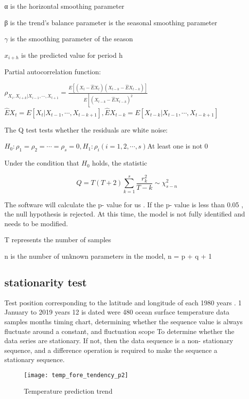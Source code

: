 \documentclass{mcmthesis}
\begin{document}
α is the horizontal smoothing parameter

β is the trend's balance parameter is the seasonal smoothing parameter

\(\gamma\) is the smoothing parameter of the season

\(x_{i+h}\) is the predicted value for period h

Partial autocorrelation function:

\(\rho_{X_{i}, X_{i+k} | X_{i-1}, \cdots, X_{t+1}}=\frac{E\left[\left(X_{t}-\hat{E} X_{t}\right)\left(X_{t-k}-\hat{E} X_{t-k}\right)\right]}{E\left[\left(X_{t-k}-\hat{E} X_{t-k}\right)^{2}\right.}\)
\(\hat{E} X_{t}=E\left[X_{t} | X_{t-1}, \cdots, X_{t-k+1}\right], \hat{E} X_{t-k}=E\left[X_{t-k} | X_{t-1}, \cdots, X_{t-k+1}\right]\)

The Q test tests whether the residuals are white noise:

\(H_{0}: \rho_{1}=\rho_{2}=\cdots=\rho_{s}=0, H_{1}: \rho_{i}(i=1,2, \cdots, s)\)At least one is not 0

Under the condition that \(H_{0}\) holds, the statistic

\[
Q=T(T+2) \sum_{k=1}^{s} \frac{r_{k}^{2}}{T-k} \sim \chi_{s-n}^{2}
\]

The software will calculate the p- value for us . If the p- value is less than 0.05 , the null hypothesis is rejected. At this time, the model is not fully identified and needs to be modified.

T represents the number of samples

n is the number of unknown parameters in the model, n = p + q + 1

\subsection{stationarity test}
Test position corresponding to the latitude and longitude of each 1980 years . 1 January to 2019 years 12 is dated were 480 ocean surface temperature data samples months timing chart, determining whether the sequence value is always fluctuate around a constant, and fluctuation scope To determine whether the data series are stationary. If not, then the data sequence is a non- stationary sequence, and a difference operation is required to make the sequence a stationary sequence.

\begin{figure}[h]
	\small
	\centering
	\texttt{[image: temp\_fore\_tendency\_p2]}
	\caption{Temperature prediction trend} \label{fig:aa}
\end{figure}
\end{document}
